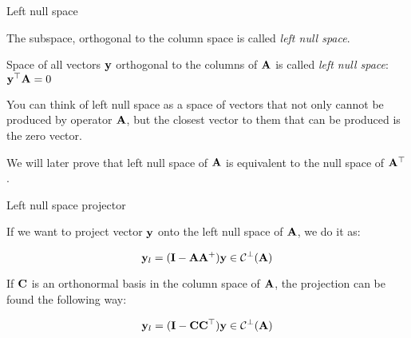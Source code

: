 \documentclass{beamer}
\begin{document}
\begin{frame}{Left null space}
\begin{flushleft}

The subspace, orthogonal to the column space is called \emph{left null space}.

\bigskip

\begin{definition}
	Space of all vectors $\mathbf{y}$ orthogonal to the columns of $\mathbf{A}$ is called \emph{left null space}: $\mathbf{y}^\top\mathbf{A} = 0$
\end{definition}

You can think of left null space as a space of vectors that not only cannot be produced by operator $\mathbf{A}$, but the closest vector to them that can be produced is the zero vector.

\bigskip

We will later prove that left null space of $\mathbf{A}$ is equivalent to the null space of $\mathbf{A}^\top$.


\end{flushleft}
\end{frame}




\begin{frame}{Left null space projector}
	\begin{flushleft}
		
If we want to project vector $\mathbf{y}$ onto the left null space of $\mathbf{A}$, we do it as:

\begin{equation}
	\mathbf{y}_l = (\mathbf{I} - \mathbf{A}\mathbf{A}^+) \mathbf{y} \in \mathcal{C}^\perp(\mathbf{A})
\end{equation}

If $\mathbf{C}$ is an orthonormal basis in the column space of $\mathbf{A}$, the projection can be found the following way:

\begin{equation}
	\mathbf{y}_l = (\mathbf{I} - \mathbf{C}\mathbf{C}^\top) \mathbf{y} \in \mathcal{C}^\perp(\mathbf{A})
\end{equation}

		
	\end{flushleft}
\end{frame}
\end{document}
